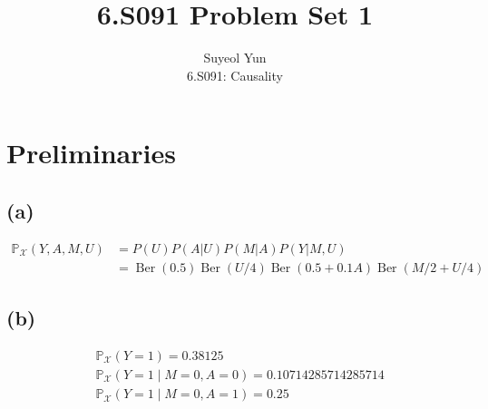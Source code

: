 \documentclass[10pt]{article}
\begin{document}
 
\title{6.S091 Problem Set 1}
\author{Suyeol Yun\\
6.S091: Causality}
\maketitle
 
\section{Preliminaries}
\subsection{(a)} 
\begin{align*}
\mathbb{P}_{\mathcal{X}}(Y,A,M,U) &= P(U)P(A|U)P(M|A)P(Y|M, U) \\
&= \operatorname{Ber}(0.5) \operatorname{Ber}(U/4) \operatorname{Ber}(0.5 + 0.1A)\operatorname{Ber}(M/2 + U/4)
\end{align*}

\subsection{(b)} 
\begin{align*}
&\mathbb{P}_{\mathcal{X}}(Y=1) = 0.38125\\
&\mathbb{P}_{\mathcal{X}}(Y=1 \mid M=0, A=0)= 0.10714285714285714\\
&\mathbb{P}_{\mathcal{X}}(Y=1 \mid M=0, A=1)= 0.25\\
\end{align*}




\end{document}
